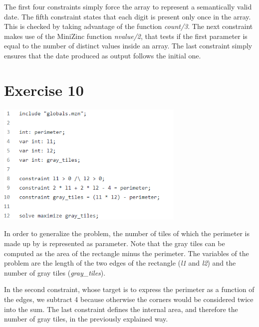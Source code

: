 \documentclass{article}
\begin{document}
The first four constraints simply force the array to represent a semantically valid date.
The fifth constraint states that each digit is present only once in the array. This is checked
by taking advantage of the function \textit{count/3}. The next constraint makes use of the MiniZinc
function \textit{nvalue/2}, that tests if the first parameter is equal to the number of distinct values inside an array.
The last constraint simply ensures that the date produced as output follows the initial one.

\section{Exercise 10}
\vspace{0.2cm}
\includegraphics[width=9cm]{img/Es10.png}
\vspace{0.2cm}

In order to generalize the problem, the number of tiles of which the perimeter is made up by is represented
as parameter. Note that the gray tiles can be computed as the area of the rectangle minus the perimeter.
The variables of the problem are the length of the two edges of the rectangle (\textit{l1} and \textit{l2})
and the number of gray tiles (\textit{gray\_tiles}).

In the second constraint, whose target is to express the perimeter as a function of the edges, we subtract 4
because otherwise the corners would be considered twice into the sum. 
The last constraint defines the internal area, and therefore the number of gray tiles, in the previously explained
way.
\end{document}
